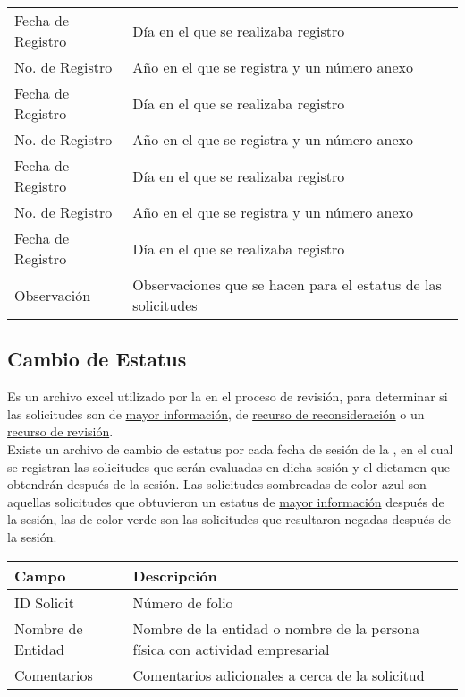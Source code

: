 \begin{tabular}{ m{} m{}  }
	Fecha de Registro &  Día en el que se realizaba registro\\
	\rowcolor{gray1}No. de Registro   &Año en el  que se registra y un número anexo \\
	Fecha de Registro&  Día en el que se realizaba registro\\
	\rowcolor{gray1} No. de Registro   & Año en el  que se registra y un número anexo\\
	Fecha de Registro &  Día en el que se realizaba registro\\
	\rowcolor{gray1}No. de Registro   &Año en el  que se registra y un número anexo \\
	Fecha de Registro &  Día en el que se realizaba registro\\
	\rowcolor{gray1} Observación&Observaciones que se hacen para el estatus de las solicitudes \\
\end{tabular}


\subsection{Cambio de Estatus}
\label{appendix:Reportes:DireccionRENIECYT:CambioEstatus}

Es un archivo excel utilizado por la  en el proceso de revisión, para determinar si las solicitudes son de \hyperref[glosario:SolicitudDeMI]{mayor información}, de \hyperref[glosario:Reconsideracion]{recurso de reconsideración} o un \hyperref[glosario:RecursoDeRevision]{recurso de revisión}.\\

\noindent Existe un archivo de cambio de estatus por cada fecha de sesión de la , en el cual se registran las solicitudes que serán evaluadas en dicha sesión y el dictamen que obtendrán después de la sesión. Las solicitudes sombreadas de color azul son aquellas solicitudes que obtuvieron un estatus de \hyperref[glosario:SolicitudDeMI]{mayor información} después de la sesión, las de color verde son las solicitudes que resultaron negadas después de la sesión.\\


\begin{tabular}{ m{} m{}  }%
	\rowcolor{gray1} {\bf Campo} &  {\bf Descripción} \\ \hline \hline
	ID Solicit & Número de folio \\
	\rowcolor{gray1} Nombre de Entidad & Nombre de la entidad o nombre de la persona física con actividad empresarial \\
	Comentarios & Comentarios adicionales a cerca de la solicitud \\
\end{tabular}


